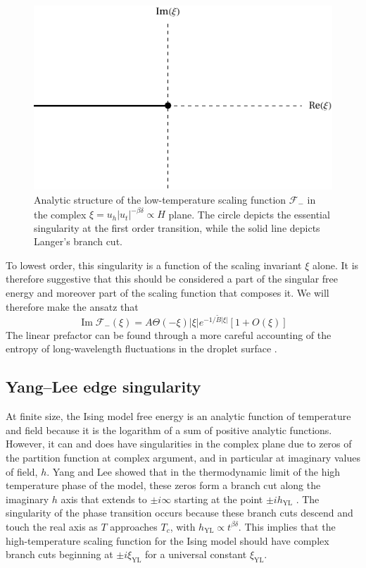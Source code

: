 \documentclass[
  aps,
  pre,
  preprint,
  longbibliography,
  floatfix
]{revtex4-2}
\begin{document}
\begin{figure}
  \includegraphics{figs/F_lower_singularities.pdf}
  \caption{
    Analytic structure of the low-temperature scaling function $\mathcal F_-$
    in the complex $\xi=u_h|u_t|^{-\beta\delta}\propto H$ plane. The circle
    depicts the essential singularity at the first order transition, while the
    solid line depicts Langer's branch cut.
  } \label{fig:lower.singularities}
\end{figure}

To lowest order, this singularity is a function of the scaling invariant $\xi$
alone. It is therefore suggestive that this should be considered a part of the
singular free energy and moreover part of the scaling function that composes
it. We will therefore make the ansatz that
\begin{equation} \label{eq:essential.singularity}
  \operatorname{Im}\mathcal F_-(\xi)=A\Theta(-\xi)|\xi|e^{-1/\tilde B|\xi|}\left[1+O(\xi)\right]
\end{equation}
\cite{Houghton_1980_The}
The linear prefactor can be found through a more careful accounting of the
entropy of long-wavelength fluctuations in the droplet surface
\cite{Gunther_1980_Goldstone}.

\subsection{Yang--Lee edge singularity}

At finite size, the Ising model free energy is an analytic function of
temperature and field because it is the logarithm of a sum of positive analytic
functions. However, it can and does have singularities in the complex plane due
to zeros of the partition function at complex argument, and in particular at
imaginary values of field, $h$. Yang and Lee showed that in the thermodynamic
limit of the high temperature phase of the model, these zeros form a branch cut
along the imaginary $h$ axis that extends to $\pm i\infty$ starting at the
point $\pm ih_{\mathrm{YL}}$ \cite{Yang_1952_Statistical, Lee_1952_Statistical}.
The singularity of the phase transition occurs because these branch cuts
descend and touch the real axis as $T$ approaches $T_c$, with
$h_{\mathrm{YL}}\propto t^{\beta\delta}$. This implies that the
high-temperature scaling function for the Ising model should have complex
branch cuts beginning at $\pm i\xi_{\mathrm{YL}}$ for a universal constant
$\xi_{\mathrm{YL}}$.
\end{document}

